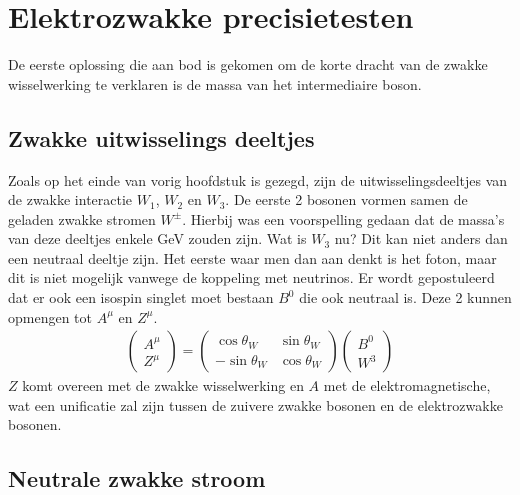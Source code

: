 \documentclass[../main.tex]{subfiles}
\begin{document}
\section{Elektrozwakke precisietesten}%
\label{sec:elektrozwakke_precisie_testen}

De eerste oplossing die aan bod is gekomen om de korte dracht van de zwakke wisselwerking te verklaren is de massa van het intermediaire boson.

\subsection{Zwakke uitwisselings deeltjes}%
\label{sub:zwakke_uitwisselings_deeltjes}

Zoals op het einde van vorig hoofdstuk is gezegd, zijn de uitwisselingsdeeltjes van de zwakke interactie $W_1$, $W_2$ en $W_3$. De eerste 2 bosonen vormen samen de geladen zwakke stromen $W^\pm$. Hierbij was een voorspelling gedaan dat de massa's van deze deeltjes enkele GeV zouden zijn. Wat is $W_3$ nu? Dit kan niet anders dan een neutraal deeltje zijn. Het eerste waar men dan aan denkt is het foton, maar dit is niet mogelijk vanwege de koppeling met neutrinos. Er wordt gepostuleerd dat er ook een isospin singlet moet bestaan $B^0$ die ook neutraal is. Deze 2 kunnen opmengen tot $A^\mu$ en $Z^\mu$.
\begin{equation}
    \begin{aligned}
        \label{eq:zwakke_boson_opmenging}
        \begin{pmatrix}
            A^\mu\\
            Z^\mu
        \end{pmatrix}
        =
        \begin{pmatrix}
            \cos\theta_W & \sin\theta_W\\
            -\sin\theta_W & \cos\theta_W
        \end{pmatrix}
        \begin{pmatrix}
            B^0\\
            W^3
        \end{pmatrix}
    \end{aligned}
\end{equation}
$Z$ komt overeen met de zwakke wisselwerking en $A$ met de elektromagnetische, wat een unificatie zal zijn tussen de zuivere zwakke bosonen en de elektrozwakke bosonen.

\subsection{Neutrale zwakke stroom}%
\label{sub:neutrale_zwakke_stroom}
\end{document}
